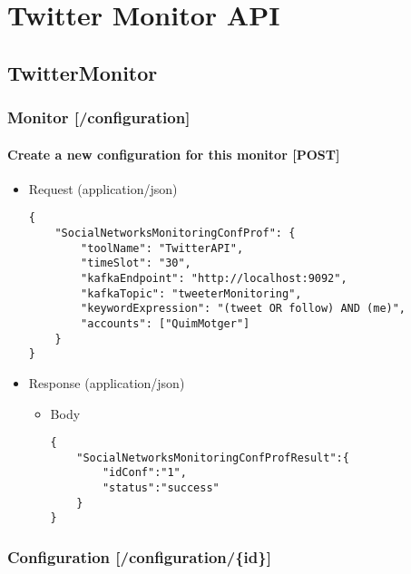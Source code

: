 
\chapter{Twitter Monitor API} %

\label{TwitterMonitor} %

\section{TwitterMonitor}\label{twittermonitor}

\subsection{Monitor {[}/configuration{]}}\label{monitor-configuration}

\subsubsection{Create a new configuration for this monitor
{[}POST{]}}\label{create-a-new-configuration-for-this-monitor-post}

\begin{itemize}
\item
  Request (application/json)

\begin{verbatim}
{
    "SocialNetworksMonitoringConfProf": {
        "toolName": "TwitterAPI",
        "timeSlot": "30",
        "kafkaEndpoint": "http://localhost:9092",
        "kafkaTopic": "tweeterMonitoring",
        "keywordExpression": "(tweet OR follow) AND (me)",
        "accounts": ["QuimMotger"]
    }
}
\end{verbatim}
\item
  Response (application/json)

  \begin{itemize}
  \item
    Body

\begin{verbatim}
{
    "SocialNetworksMonitoringConfProfResult":{
        "idConf":"1",
        "status":"success"
    }
}
\end{verbatim}
  \end{itemize}
\end{itemize}

\subsection{Configuration
{[}/configuration/\{id\}{]}}\label{configuration-configurationid}

